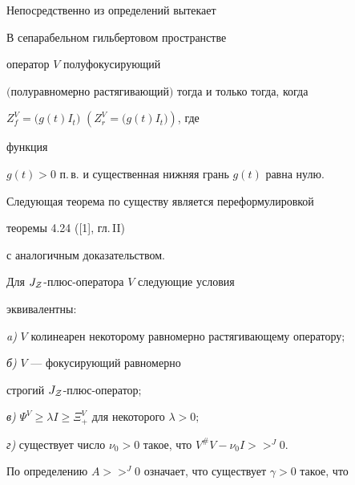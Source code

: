 Непосредственно из определений вытекает





\begin{cor}


В сепарабельном гильбертовом пространстве


оператор $V$ полуфокусирующий


$($полуравномерно растягивающий$)$ тогда и только тогда, когда


$Z_{f}^{V}=\big( g(t)I_{t}\big)$ $(Z_{r}^{V}=\big(g(t)I_{t}\big))$, где


функция


$g(t)>0$ п.\,в. и существенная нижняя грань $g(t)$ равна нулю.


\end{cor}





Следующая теорема по существу является переформулировкой


теоремы 4.24 ([1], гл.\,II)


с аналогичным доказательством. 





\begin{thm}


Для $J_{\cal Z}$-плюс-оператора $V$ следующие условия


эквивалентны\/${:}$ 





{\em a)} $V$ колинеарен некоторому равномерно растягивающему оператору$;$





{\em б)} $V$ --- фокусирующий равномерно 


строгий $J_{\cal Z}$-плюс-оператор$;$





{\em в)} $\Psi^{V}\geq\lambda I\geq\Xi_{+}^{V}$ для некоторого $\lambda >0;$





{\em г)} существует число $\nu_{0}>0$ такое, что $V^{\#}V-\nu_{0}I>>^{J}0.$


\end{thm}





По определению $A>>^{J}0$ означает, что существует $\gamma >0$ такое, что


